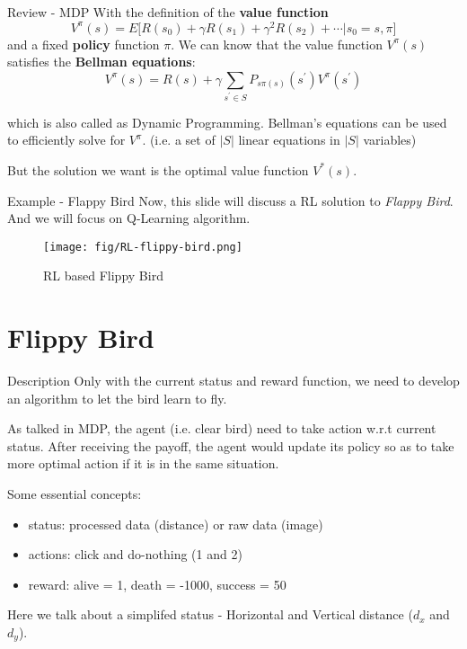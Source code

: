 \documentclass[10pt]{beamer}
\begin{document}
\begin{frame}{Review - MDP}
  With the definition of the \textbf{value function} $$V^{\pi}(s)=E\bigl[R(s_0) + \gamma R(s_1) + \gamma^2 R(s_2) + \cdots|s_0=s, \pi\bigr]$$ and a fixed \textbf{policy} function $\pi$. We can know that the value function $V^{\pi}(s)$ satisfies the \textbf{Bellman equations}: $$V^{\pi}(s)=R(s) + \gamma\sum_{s^{'}\in S}P_{s\pi(s)}(s^{'})V^{\pi}(s^{'})$$

  which is also called as \alert{Dynamic Programming}. Bellman's equations can be used to efficiently solve for $V^{\pi}$. (i.e. a set of $|S|$ linear equations in $|S|$ variables)

  But the solution we want is the optimal value function $V^{*}(s)$.
\end{frame}

\begin{frame}[fragile]{Example - Flappy Bird}
  Now, this slide will discuss a RL solution to \textit{Flappy Bird}. And we will focus on Q-Learning algorithm. 
  \begin{figure}[htbp]
    \centering
    \texttt{[image: fig/RL-flippy-bird.png]}
    \caption{RL based Flippy Bird}
  \end{figure}
\end{frame}

\section{Flippy Bird}

\begin{frame}[fragile]{Description}
  Only with the current status and reward function, we need to develop an algorithm to let the bird learn to fly.

  As talked in MDP, the agent (i.e. clear bird) need to take action w.r.t current status. After receiving the payoff, the agent would update its policy so as to take more optimal action if it is in the same situation.

  Some essential concepts:
  \begin{itemize}
    \item status: processed data (distance) or raw data (image)
    \item actions: click and do-nothing (1 and 2)
    \item reward: alive = 1, death = -1000, success = 50
  \end{itemize}

  Here we talk about a simplifed status - Horizontal and Vertical distance ($d_x$ and $d_y$).
\end{frame}
\end{document}
